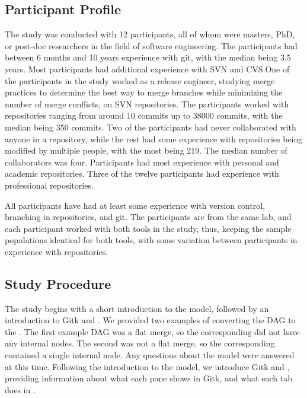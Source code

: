 \subsection{Participant Profile}
\label{sub:participant_profile}

The study was conducted with 12 participants, all of whom were masters,
PhD, or post-doc researchers in the field of software engineering. The
participants had between 6 months and 10 years experience with git, with
the median being 3.5 years. Most participants had additional experience
with SVN and CVS.\@ One of the participants in the study worked as a
release engineer, studying merge practices to determine the best way to
merge branches while minimizing the number of merge conflicts, on SVN
repositories. The participants worked with repositories ranging from
around 10 commits up to 38000 commits, with the median being 350
commits. Two of the participants had never collaborated with anyone in a
repository, while the rest had some experience with repositories being
modified by multiple people, with the most being 219. The median number
of collaborators was four. Participants had most experience with
personal and academic repositories. Three of the twelve participants had
experience with professional repositories.

All participants have had at least some experience with version control,
branching in repositories, and git. The participants are from the same
lab, and each participant worked with both tools in the study, thus,
keeping the sample populations identical for both tools, with some
variation between participants in experience with repositories.

\subsection{Study Procedure}
\label{sub:study_procedure}

The study begins with a short introduction to the \mt model, followed by
an introduction to Gitk and \tool. We provided two examples of
converting the DAG to the \mt. The first example DAG was a flat merge,
so the corresponding \mt did not have any internal nodes. The
second was not a flat merge, so the corresponding \mt contained a
single internal node. Any questions about the model were answered at
this time. Following the introduction to the \mt model, we introduce
Gitk and \tool, providing information about what each pane shows in
Gitk, and what each tab does in \tool.

